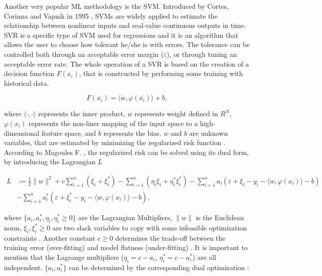 Another very popular \ac{ML} methodology is the \ac{SVM}. Introduced by Cortes, Corinna and Vapnik in 1995 \cite{svm1}, \ac{SVM}s are widely applied to estimate the relationship between nonlinear inputs and real-value continuous outputs in time. \ac{SVR} is a specific type of \ac{SVM} used for regressions and it is an algorithm that allows the user to choose how tolerant he/she is with errors. The tolerance can be controlled both through an acceptable error margin ($\varepsilon$), or through tuning an acceptable error rate. The whole operation of a \ac{SVR} is based on the creation of a decision function $F(x_i)$, that is constructed by performing some training with historical data.

\begin{equation}
   F(x_i) = \langle w, \varphi(x_i) \rangle + b,
   \label{svmdec}
\end{equation}

where $\langle\cdot,\cdot\rangle$ represents the inner product, $w$ represents weight defined in $R^N$, $\varphi(x_i)$ represents the non-liner mapping of the input space to a high-dimensional feature space, and $b$ represents the bias\cite{svm2}. $w$ and $b$ are unknown variables, that are estimated by minimizing the regularized risk function \cite{svm2}. According to Magoules F. \cite{ann1}, the regularized risk can be solved using its dual form, by introducing the Lagrangian $L$

\begin{equation}
\begin{split}
       L & := \frac{1}{2}\parallel w \parallel^2 + c \sum_{i=1}^{n}(\xi_i + \xi_i^*) - \sum_{i=1}^{n}(\eta_i\xi_i + \eta_i^*\xi_i^*) - \sum_{i=1}^{n}a_i(\varepsilon + \xi_i - y_i- \langle w, \varphi(x_i) \rangle - b) \\ 
         & - \sum_{i=1}^{n}a_i^*(\varepsilon + \xi_i^* - y_i- \langle w, \varphi(x_i) \rangle - b),
\end{split}
\end{equation}

where $\{a_i, a_i^*, \eta_i, \eta_i^*\geq 0\}$ are the Lagrangian Multipliers, $\parallel w \parallel$ is the Euclidean norm, ${{\xi_i,\xi_i^*\geq 0}}$ are two slack variables to copy with some infeasible optimization constraints \cite{review2017}. Another constant $c \geq 0$ determines the trade-off between the training error (over-fitting) and model flatness (under-fitting) \cite{review2017}. 
It is important to mention that the Lagrange multipliers ($\eta_i = c - a_i$, $\eta_i^* = c-a_i^*$) are all independent. $\{a_i, a_i^*\}$ can be determined by the corresponding dual optimization \cite{ann1}:

